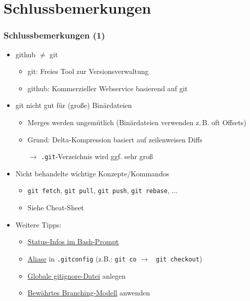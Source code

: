 \documentclass{beamer}
\begin{document}
\section{Schlussbemerkungen}

\begin{frame}[fragile,label=schluss10]
\frametitle{Schlussbemerkungen (1)}
\begin{itemize}
\item github $\neq$ git
\begin{itemize}
 \item git: Freies Tool zur Versionsverwaltung
 \item github: Kommerzieller Webservice basierend auf git
\end{itemize}
\bigskip
\pause
\item git nicht gut für (große) Binärdateien
\begin{itemize}
 \item Merges werden ungemütlich (Binärdateien verwenden z.\,B. oft Offsets)
 \item Grund: Delta-Kompression basiert auf zeilenweisen Diffs
 \item[$\rightarrow$] \verb|.git|-Verzeichnis wird ggf. sehr groß
\end{itemize}
\bigskip
\pause
\item Nicht behandelte wichtige Konzepte/Kommandos
\begin{itemize}
 \item \verb|git fetch|, \verb|git pull|, \verb|git push|,  \verb|git rebase|, ...
 \item Siehe Cheat-Sheet
\end{itemize}
\bigskip
\pause
\item Weitere Tipps:
\begin{itemize}
\item \href{https://github.com/magicmonty/bash-git-prompt}{Status-Infos im Bash-Prompt}~
\item \href{https://git-scm.com/book/en/v2/Git-Basics-Git-Aliases}{Aliase} in \verb|.gitconfig| (z.B.: \verb|git co| $\rightarrow$ \verb| git checkout|)
\item \href{https://stackoverflow.com/a/7335487/333403}{Globale gitignore-Datei} anlegen
\item \href{http://nvie.com/posts/a-successful-git-branching-model/}{Bewährtes Branching-Modell} anwenden
\end{itemize}

\end{itemize}
\end{frame}
\end{document}
